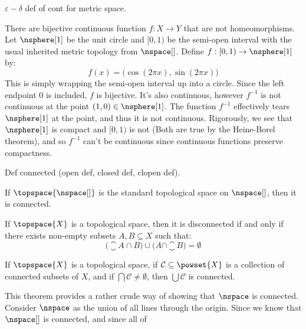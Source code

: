     $\varepsilon-\delta$ def of cont for metric space.
    \begin{example}
        There are bijective continuous function $f:X\rightarrow{Y}$ that
        are not homeomorphisms. Let $\nsphere[1]$ be the unit circle and
        $[0,1)$ be the semi-open interval with the usual inherited metric
        topology from $\nspace[]$. Define $f:[0,1)\rightarrow\nsphere[1]$
        by:
        \begin{equation}
            f(x)=\big(\cos(2\pi{x}),\sin(2\pi{x})\big)
        \end{equation}
        This is simply wrapping the semi-open interval up into a circle.
        Since the left endpoint 0 is included, $f$ is bijective. It's also
        continuous, however $f^{\minus{1}}$ is not continuous at the point
        $(1,0)\in\nsphere[1]$. The function $f^{\minus{1}}$ effectively
        tears $\nsphere[1]$ at the point, and thus it is not continuous.
        Rigorously, we see that $\nsphere[1]$ is compact and $[0,1)$ is not
        (Both are true by the Heine-Borel theorem), and so $f^{\minus{1}}$
        can't be continuous since continuous functions preserve compactness.
    \end{example}
    Def connected (open def, closed def, clopen def).
    \begin{theorem}
        If $\topspace{\nspace[]}$ is the standard topological space on
        $\nspace[]$, then it is connected.
    \end{theorem}
    \begin{theorem}
        If $\topspace{X}$ is a topological space, then it is disconnected
        if and only if there exists non-empty subsets $A,B\subseteq{X}$ such
        that:
        \begin{equation}
            \big(\closure{A}\cap{B}\big)\cup\big(A\cap\closure{B}\big)
            =\emptyset
        \end{equation}
    \end{theorem}
    \begin{theorem}
        If $\topspace{X}$ is a topological space, if
        $\mathcal{C}\subseteq\powset{X}$ is a collection of connected
        subsets of $X$, and if $\bigcap\mathcal{C}\ne\emptyset$, then
        $\bigcup\mathcal{C}$ is connected.
    \end{theorem}
    This theorem provides a rather crude way of showing that $\nspace$ is
    connected. Consider $\nspace$ as the union of all lines through the
    origin. Since we know that $\nspace[]$ is connected, and since all of
